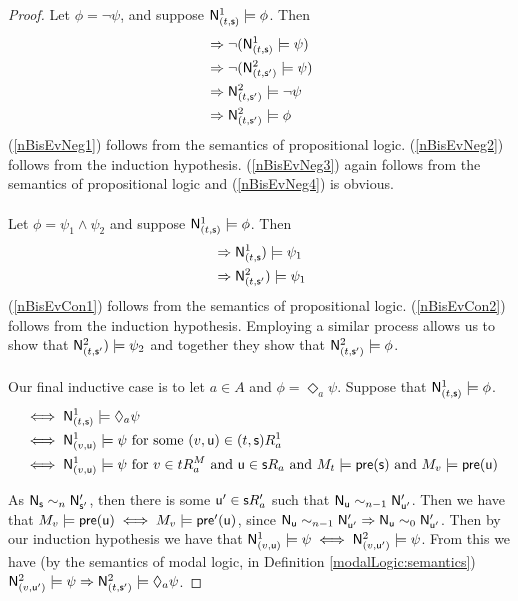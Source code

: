 \begin{proof}
Let $\phi = \neg \psi$, and suppose $\mathrm{\mathsf{N}}^1_{(t,\mathrm{\mathsf{s}})} \models \phi$.
Then
\begin{align}
	& \Rightarrow \neg (\mathrm{\mathsf{N}}^1_{(t,\mathrm{\mathsf{s}})} \models \psi) \label{nBisEvNeg1} \\
	& \Rightarrow \neg (\mathrm{\mathsf{N}}^2_{(t,\mathrm{\mathsf{s}}')} \models \psi) \label{nBisEvNeg2} \\
	& \Rightarrow \mathrm{\mathsf{N}}^2_{(t,\mathrm{\mathsf{s}}')} \models \neg \psi \label{nBisEvNeg3} \\
	& \Rightarrow \mathrm{\mathsf{N}}^2_{(t,\mathrm{\mathsf{s}}')} \models \phi \label{nBisEvNeg4}
\end{align}
(\ref{nBisEvNeg1}) follows from the semantics of propositional logic.
(\ref{nBisEvNeg2}) follows from the induction hypothesis.
(\ref{nBisEvNeg3}) again follows from the semantics of propositional logic and (\ref{nBisEvNeg4}) is obvious.\\
\\
Let $\phi = \psi_1 \land \psi_2$ and suppose $\mathrm{\mathsf{N}}^1_{(t,\mathrm{\mathsf{s}})} \models \phi$.
Then
\begin{align}
	& \Rightarrow \mathrm{\mathsf{N}}^1_{(t,\mathrm{\mathsf{s}}}) \models \psi_1 \label{nBisEvCon1} \\
	& \Rightarrow \mathrm{\mathsf{N}}^2_{(t,\mathrm{\mathsf{s}}'}) \models \psi_1 \label{nBisEvCon2}
\end{align}
(\ref{nBisEvCon1}) follows from the semantics of propositional logic.
(\ref{nBisEvCon2}) follows from the induction hypothesis.
Employing a similar process allows us to show that $\mathrm{\mathsf{N}}^2_{(t,\mathrm{\mathsf{s}}'}) \models \psi_2$ and together they 
show that $\mathrm{\mathsf{N}}^2_{(t,\mathrm{\mathsf{s}}')} \models \phi$.\\
\\
Our final inductive case is to let $a \in A$ and $\phi = \Diamond_a \psi$.
Suppose that $\mathrm{\mathsf{N}}^1_{(t,\mathrm{\mathsf{s}})} \models \phi$.
\begin{align}
	& \iff \mathrm{\mathsf{N}}^1_{(t,\mathrm{\mathsf{s}})} \models \Diamond_a \psi \label{nBisEvMod1} \\
	& \iff \mathrm{\mathsf{N}}^1_{(v,\mathrm{\mathsf{u}})} \models \psi \text{ for some $(v,\mathrm{\mathsf{u}}) \in (t,\mathrm{\mathsf{s}}) R^1_a$} \label{nBisEvMod2} \\
	& \iff \mathrm{\mathsf{N}}^1_{(v,\mathrm{\mathsf{u}})} \models \psi \text{ for $v \in t R^M_a$ and $\mathrm{\mathsf{u}} \in \mathrm{\mathsf{s}} R_a$ and $M_t \models
		\mathrm{\mathsf{pre}}(\mathrm{\mathsf{s}})$ and $M_v \models \mathrm{\mathsf{pre}}(\mathrm{\mathsf{u}})$} \label{nBisEvMod3}
\end{align}

As $\mathrm{\mathsf{N}}_\mathrm{\mathsf{s}} \sim_n \mathrm{\mathsf{N}}'_{\mathrm{\mathsf{s}}'}$, then there is some $\mathrm{\mathsf{u}}' \in \mathrm{\mathsf{s}} R'_a$ such that $\mathrm{\mathsf{N}}_\mathrm{\mathsf{u}} \sim_{n-1} \mathrm{\mathsf{N}}'_{\mathrm{\mathsf{u}}'}$.
Then we have that $M_v \models \mathrm{\mathsf{pre}}(\mathrm{\mathsf{u}}) \iff M_v \models \mathrm{\mathsf{pre}}'(\mathrm{\mathsf{u}})$, since $\mathrm{\mathsf{N}}_\mathrm{\mathsf{u}} \sim_{n-1} \mathrm{\mathsf{N}}'_{\mathrm{\mathsf{u}}'}
\Rightarrow \mathrm{\mathsf{N}}_\mathrm{\mathsf{u}} \sim_0 \mathrm{\mathsf{N}}'_{\mathrm{\mathsf{u}}'}$.
Then by our induction hypothesis we have that $\mathrm{\mathsf{N}}^1_{(v,\mathrm{\mathsf{u}})} \models \psi \iff \mathrm{\mathsf{N}}^2_{(v, \mathrm{\mathsf{u}}')} \models
\psi$.
From this we have (by the semantics of modal logic, in Definition \ref{modalLogic:semantics}) $\mathrm{\mathsf{N}}^2_{(v,\mathrm{\mathsf{u}}')}
\models \psi \Rightarrow \mathrm{\mathsf{N}}^2_{(t,\mathrm{\mathsf{s}}')} \models \Diamond_a \psi$.
\end{proof}

